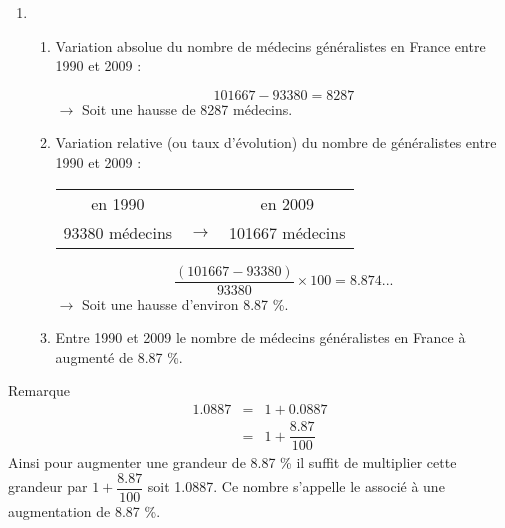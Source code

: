 \documentclass[xcolor={dvipsnames}]{beamer}
\begin{document}
\begin{frame}
\begin{enumerate}
	\item 
	\begin{enumerate} [a]
		\item Variation absolue du nombre de médecins généralistes en France entre 1990 et 2009 :\pause
		
		\begin{equation*}
		\num{101667} - \num{93380} = \num{8287}
		\end{equation*}
		$\rightarrow$  Soit une hausse de \num{8287} médecins.\pause
		
		
		\item Variation relative (ou taux d'évolution) du nombre de généralistes entre \num{1990} et \num{2009} :\pause
		
		\begin{table}[h!]
			\centering
			
			
			\begin{tabular}{|ccc|}
				\hline
				en \num{1990} &    & en \num{2009} \\
				\num{93380} médecins& $\rightarrow$ & \num{101667} médecins \\
				\hline
			\end{tabular}
		\end{table}
		
		\begin{equation*}
		\dfrac{(\num{101667} - \num{93380})}{\num{93380}} \times 100 = \num{8.874}...
		\end{equation*}
		$\rightarrow$ Soit une hausse d'environ \num{8.87} \%.\pause
		
		\item Entre 1990 et 2009 le nombre de médecins généralistes en France à augmenté de \num{8.87} \%.
	\end{enumerate}
\end{enumerate}
\end{frame}

\begin{frame}
			\begin{block}{Remarque}
			\begin{eqnarray*}
				\num{1.0887} & = & 1 + \num{0.0887} \\
				& = & 1 + \dfrac{\num{8.87}}{100}
			\end{eqnarray*}
%			
			Ainsi pour augmenter une grandeur de \num{8.87} \% il suffit de multiplier cette grandeur par $1 + \dfrac{8.87}{100}$ soit \num{1.0887}. Ce nombre s'appelle le  associé à une augmentation de \num{8.87} \%.
		\end{block}
\end{frame}
\end{document}
